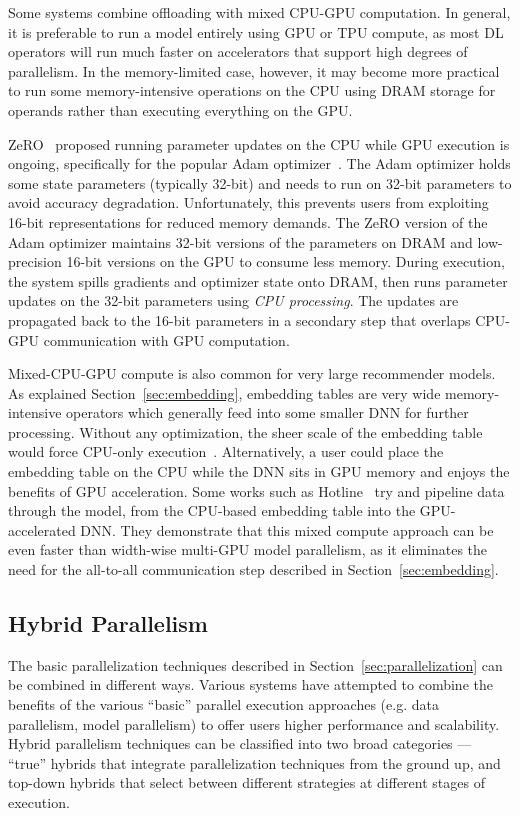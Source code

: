 Some systems combine offloading with mixed CPU-GPU computation. In general, it is preferable to run a model entirely using GPU or TPU compute, as most DL operators will run much faster on accelerators that support high degrees of parallelism. In the memory-limited case, however, it may become more practical to run some memory-intensive operations on the CPU using DRAM storage for operands rather than executing everything on the GPU.

ZeRO~\cite{zerooffload2021} proposed running parameter updates on the CPU while GPU execution is ongoing, specifically for the popular Adam optimizer~\cite{adam2014}. The Adam optimizer holds some state parameters (typically 32-bit) and needs to run on 32-bit parameters to avoid accuracy degradation. Unfortunately, this prevents users from exploiting 16-bit representations for reduced memory demands. The ZeRO version of the Adam optimizer maintains 32-bit versions of the parameters on DRAM and low-precision 16-bit versions on the GPU to consume less memory. During execution, the system spills gradients and optimizer state onto DRAM, then runs parameter updates on the 32-bit parameters using \textit{CPU processing}. The updates are propagated back to the 16-bit parameters in a secondary step that overlaps CPU-GPU communication with GPU computation. 

Mixed-CPU-GPU compute is also common for very large recommender models. As explained Section~\ref{sec:embedding}, embedding tables are very wide memory-intensive operators which generally feed into some smaller DNN for further processing. Without any optimization, the sheer scale of the embedding table would force CPU-only execution~\cite{dlrmscale2020}. Alternatively, a user could place the embedding table on the CPU while the DNN sits in GPU memory and enjoys the benefits of GPU acceleration. Some works such as Hotline~\cite{hotline2020} try and pipeline data through the model, from the CPU-based embedding table into the GPU-accelerated DNN. They demonstrate that this mixed compute approach can be even faster than width-wise multi-GPU model parallelism, as it eliminates the need for the all-to-all communication step described in Section~\ref{sec:embedding}.

\subsection{Hybrid Parallelism}
The basic parallelization techniques described in Section~\ref{sec:parallelization} can be combined in different ways. Various systems have attempted to combine the benefits of the various ``basic'' parallel execution approaches (e.g. data parallelism, model parallelism) to offer users higher performance and scalability. Hybrid parallelism techniques can be classified into two broad categories --- ``true'' hybrids that integrate parallelization techniques from the ground up, and top-down hybrids that select between different strategies at different stages of execution. 

